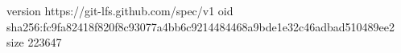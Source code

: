 version https://git-lfs.github.com/spec/v1
oid sha256:fc9fa82418f820f8c93077a4bb6c9214484468a9bde1e32c46adbad510489ee2
size 223647
